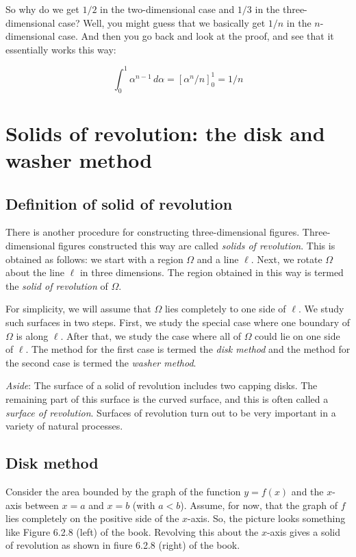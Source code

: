 \documentclass[10pt]{amsart}
\begin{document}
So why do we get $1/2$ in the two-dimensional case and $1/3$ in the
three-dimensional case? Well, you might guess that we basically get
$1/n$ in the $n$-dimensional case. And then you go back and look at
the proof, and see that it essentially works this way:

$$\int_0^1 \alpha^{n - 1}\, d\alpha = [\alpha^n/n]_0^1 = 1/n$$

\section{Solids of revolution: the disk and washer method}

\subsection{Definition of solid of revolution}

There is another procedure for constructing three-dimensional
figures. Three-dimensional figures constructed this way are called
{\em solids of revolution}. This is obtained as follows: we start with
a region $\Omega$ and a line $\ell$. Next, we rotate $\Omega$ about
the line $\ell$ in three dimensions. The region obtained in this way
is termed the {\em solid of revolution} of $\Omega$.

For simplicity, we will assume that $\Omega$ lies completely to one
side of $\ell$. We study such surfaces in two steps. First, we study
the special case where one boundary of $\Omega$ is along $\ell$. After
that, we study the case where all of $\Omega$ could lie on one side of
$\ell$. The method for the first case is termed the {\em disk method}
and the method for the second case is termed the {\em washer method}.

{\em Aside}: The surface of a solid of revolution includes two capping
disks. The remaining part of this surface is the curved surface, and
this is often called a {\em surface of revolution}. Surfaces of
revolution turn out to be very important in a variety of natural
processes.

\subsection{Disk method}

Consider the area bounded by the graph of the function $y = f(x)$ and
the $x$-axis between $x = a$ and $x = b$ (with $a < b$). Assume, for
now, that the graph of $f$ lies completely on the positive side of the
$x$-axis. So, the picture looks something like Figure 6.2.8 (left) of
the book. Revolving this about the $x$-axis gives a solid of
revolution as shown in fiure 6.2.8 (right) of the book.
\end{document}
